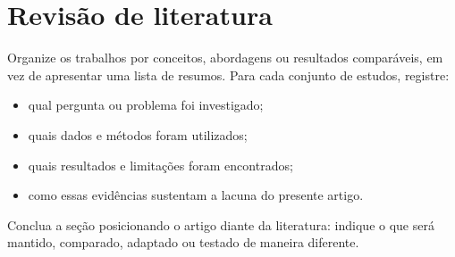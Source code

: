 \section{Revisão de literatura}
\label{sec:revisao}

Organize os trabalhos por conceitos, abordagens ou resultados comparáveis, em
vez de apresentar uma lista de resumos. Para cada conjunto de estudos, registre:

\begin{itemize}[leftmargin=*]
  \item qual pergunta ou problema foi investigado;
  \item quais dados e métodos foram utilizados;
  \item quais resultados e limitações foram encontrados;
  \item como essas evidências sustentam a lacuna do presente artigo.
\end{itemize}

Conclua a seção posicionando o artigo diante da literatura: indique o que será
mantido, comparado, adaptado ou testado de maneira diferente.
